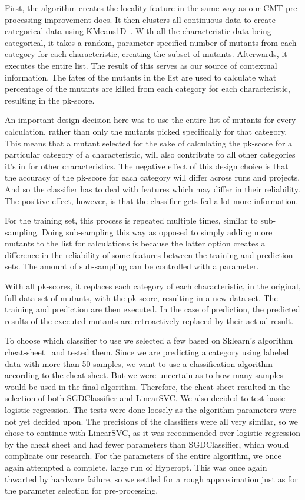 \documentclass[twoside]{uva-inf-bachelor-thesis}
\begin{document}
First, the algorithm creates the locality feature in the same way as our CMT pre-processing improvement does. It then clusters all continuous data to create categorical data using KMeans1D~\cite{kmeans1d}. With all the characteristic data being categorical, it takes a random, parameter-specified number of mutants from each category for each characteristic, creating the subset of mutants. Afterwards, it executes the entire list. The result of this serves as our source of contextual information. The fates of the mutants in the list are used to calculate what percentage of the mutants are killed from each category for each characteristic, resulting in the pk-score.

An important design decision here was to use the entire list of mutants for every calculation, rather than only the mutants picked specifically for that category. This means that a mutant selected for the sake of calculating the pk-score for a particular category of a characteristic, will also contribute to all other categories it's in for other characteristics. The negative effect of this design choice is that the accuracy of the pk-score for each category will differ across runs and projects. And so the classifier has to deal with features which may differ in their reliability. The positive effect, however, is that the classifier gets fed a lot more information.

For the training set, this process is repeated multiple times, similar to sub-sampling. Doing sub-sampling this way as opposed to simply adding more mutants to the list for calculations is because the latter option creates a difference in the reliability of some features between the training and prediction sets. The amount of sub-sampling can be controlled with a parameter.

With all pk-scores, it replaces each category of each characteristic, in the original, full data set of mutants, with the pk-score, resulting in a new data set. The training and prediction are then executed. In the case of prediction, the predicted results of the executed mutants are retroactively replaced by their actual result.

To choose which classifier to use we selected a few based on Sklearn's algorithm cheat-sheet~\cite{skCheatSheet} and tested them. Since we are predicting a category using labeled data with more than 50 samples, we want to use a classification algorithm according to the cheat-sheet. But we were uncertain as to how many samples would be used in the final algorithm. Therefore, the cheat sheet resulted in the selection of both SGDClassifier and LinearSVC. We also decided to test basic logistic regression. The tests were done loosely as the algorithm parameters were not yet decided upon. The precisions of the classifiers were all very similar, so we chose to continue with LinearSVC, as it was recommended over logistic regression by the cheat sheet and had fewer parameters than SGDClassifier, which would complicate our research. For the parameters of the entire algorithm, we once again attempted a complete, large run of Hyperopt. This was once again thwarted by hardware failure, so we settled for a rough approximation just as for the parameter selection for pre-processing.
\end{document}
